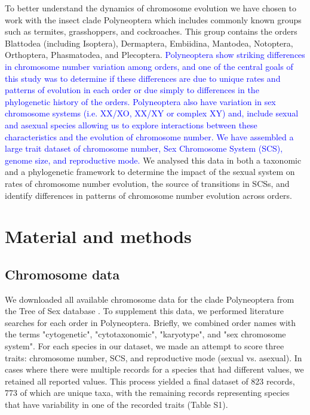 \documentclass[]{rsos}%
\begin{document}
To better understand the dynamics of chromosome evolution we have chosen to work with the insect clade Polyneoptera which includes commonly known groups such as termites, grasshoppers, and cockroaches.
This group contains the orders Blattodea (including Isoptera), Dermaptera, Embiidina, Mantodea, Notoptera, Orthoptera, Phasmatodea, and Plecoptera.
\textcolor{blue}{Polyneoptera show striking differences in chromosome number variation among orders, and one of the central goals of this study was to determine if these differences are due to unique rates and patterns of evolution in each order or due simply to differences in the phylogenetic history of the orders.
Polyneoptera also have variation in sex chromosome systems (i.e. XX/XO, XX/XY or complex XY) and, include sexual and asexual species allowing us to explore interactions between these characteristics and the evolution of chromosome number.
We have assembled a large trait dataset of chromosome number, Sex Chromosome System (SCS), genome size, and reproductive mode.}
We analysed this data in both a taxonomic and a phylogenetic framework to determine the impact of the sexual system on rates of chromosome number evolution, the source of transitions in SCSs, and identify differences in patterns of chromosome number evolution across orders.

\section{Material and methods}

\subsection{Chromosome data}
We downloaded all available chromosome data for the clade Polyneoptera from the Tree of Sex database \cite{blackmon2016,TOS2014}.
To supplement this data, we performed literature searches for each order in Polyneoptera.
Briefly, we combined order names with the terms "cytogenetic", "cytotaxonomic", "karyotype", and "sex chromosome system".
For each species in our dataset, we made an attempt to score three traits: chromosome number, SCS, and reproductive mode (sexual vs. asexual).
In cases where there were multiple records for a species that had different values, we retained all reported values.
This process yielded a final dataset of 823 records, 773 of which are unique taxa, with the remaining records representing species that have variability in one of the recorded traits (Table S1).
\end{document}
